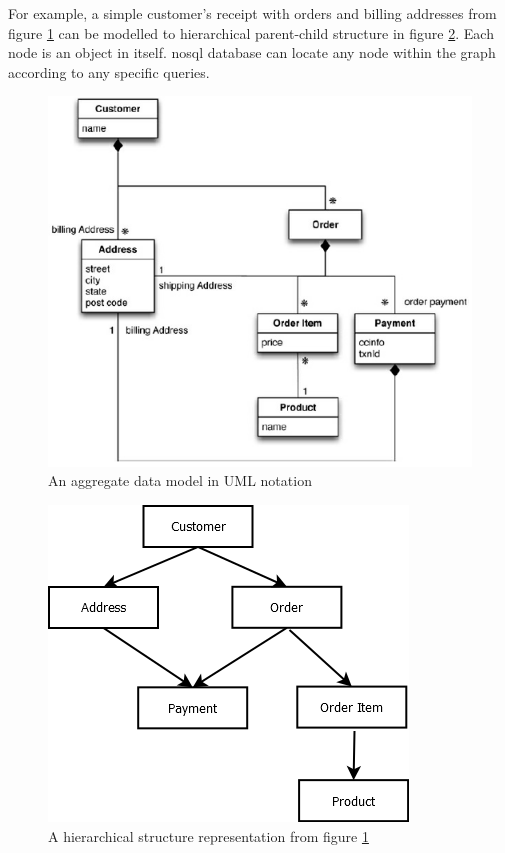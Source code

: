 For example, a simple customer's receipt with orders and billing addresses from figure \ref{nosql-aggregate-uml} can be modelled to hierarchical parent-child structure in figure \ref{nosql-aggregate-uml-realized}. 
Each node is an object in itself.
\gls{nosql} database can locate any node within the graph according to any specific queries.
\begin{figure}[h]
	\centering
	\includegraphics[scale=0.55]{res/bg-knowledge/nosql-nosql-agregate-uml}
	\caption{An aggregate data model in UML notation }
	\label{nosql-aggregate-uml}
\end{figure}
\begin{figure}[h]
	\centering
	\includegraphics[scale=0.5]{res/bg-knowledge/nosql-uml-realized}
	\caption{A hierarchical structure representation from figure \ref{nosql-aggregate-uml}}
	\label{nosql-aggregate-uml-realized}
\end{figure}

